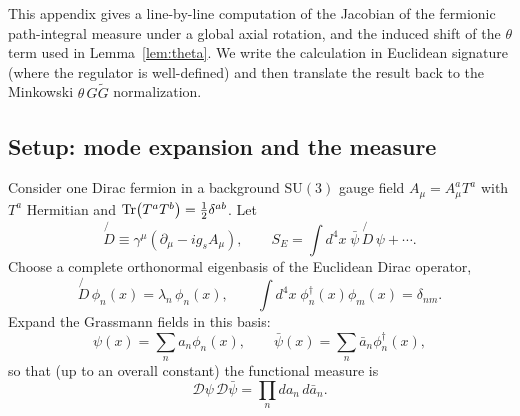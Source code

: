 \documentclass[11pt]{article}
\theoremstyle{remark}
\newcommand{\SU}{\ensuremath{\mathrm{SU}}}
\begin{document}
This appendix gives a line-by-line computation of the Jacobian of the fermionic path-integral measure
under a global axial rotation, and the induced shift of the $\theta$ term used in
Lemma~\ref{lem:theta}. We write the calculation in Euclidean signature (where the regulator is
well-defined) and then translate the result back to the Minkowski $\theta\,G\tilde G$ normalization.

\subsection{Setup: mode expansion and the measure}
Consider one Dirac fermion in a background $\SU(3)$ gauge field $A_\mu = A_\mu^a T^a$ with
$T^a$ Hermitian and $\Tr(T^a T^b)=\frac12\delta^{ab}$.
Let
\begin{equation}
\not{D}\equiv \gamma^\mu(\partial_\mu - i g_s A_\mu),\qquad
S_E=\int d^4x\;\bar\psi\,\not{D}\,\psi+\cdots .
\end{equation}
Choose a complete orthonormal eigenbasis of the Euclidean Dirac operator,
\begin{equation}
\not{D}\,\phi_n(x)=\lambda_n\,\phi_n(x),\qquad
\int d^4x\;\phi_n^\dagger(x)\phi_m(x)=\delta_{nm}.
\end{equation}
Expand the Grassmann fields in this basis:
\begin{equation}
\psi(x)=\sum_n a_n \phi_n(x),\qquad \bar\psi(x)=\sum_n \bar a_n \phi_n^\dagger(x),
\end{equation}
so that (up to an overall constant) the functional measure is
\begin{equation}
\mathcal{D}\psi\,\mathcal{D}\bar\psi=\prod_n da_n\,d\bar a_n.
\end{equation}
\end{document}

